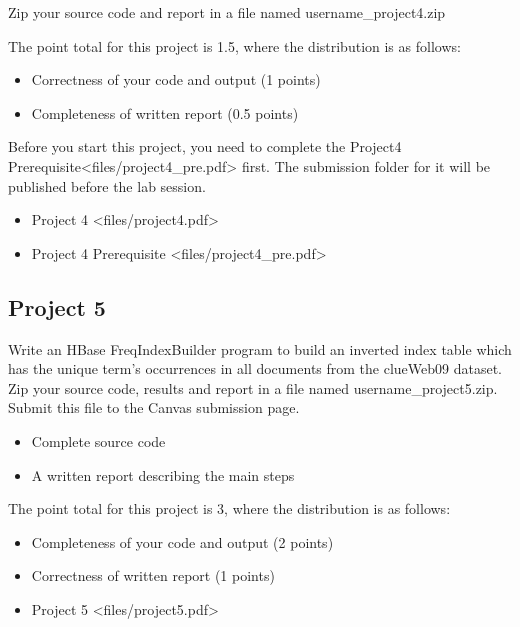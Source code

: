Zip your source code and report in a file named username\_project4.zip

The point total for this project is 1.5, where the distribution is as
follows:

\begin{itemize}
\tightlist
\item
  Correctness of your code and output (1 points)
\item
  Completeness of written report (0.5 points)
\end{itemize}

Before you start this project, you need to complete the
Project4 Prerequisite\textless{}files/project4\_pre.pdf\textgreater{}
first. The submission folder for it will be published before the lab
session.

\begin{itemize}
\tightlist
\item
  Project 4 \textless{}files/project4.pdf\textgreater{}
\item
  Project 4 Prerequisite \textless{}files/project4\_pre.pdf\textgreater{}
\end{itemize}

\subsection{Project 5}\label{project-5}

Write an HBase FreqIndexBuilder program to build an inverted index table
which has the unique term's occurrences in all documents from the
clueWeb09 dataset. Zip your source code, results and report in a file
named username\_project5.zip. Submit this file to the Canvas submission
page.

\begin{itemize}
\tightlist
\item
  Complete source code
\item
  A written report describing the main steps
\end{itemize}

The point total for this project is 3, where the distribution is as
follows:

\begin{itemize}
\tightlist
\item
  Completeness of your code and output (2 points)
\item
  Correctness of written report (1 points)
\item
  Project 5 \textless{}files/project5.pdf\textgreater{}
\end{itemize}

